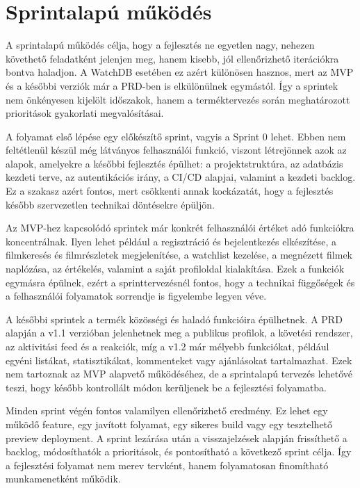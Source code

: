 \section{Sprintalapú működés}

A sprintalapú működés célja, hogy a fejlesztés ne egyetlen nagy, nehezen követhető feladatként jelenjen meg, hanem kisebb, jól ellenőrizhető iterációkra bontva haladjon. A WatchDB esetében ez azért különösen hasznos, mert az MVP és a későbbi verziók már a PRD-ben is elkülönülnek egymástól. Így a sprintek nem önkényesen kijelölt időszakok, hanem a terméktervezés során meghatározott prioritások gyakorlati megvalósításai.

A folyamat első lépése egy előkészítő sprint, vagyis a Sprint 0 lehet. Ebben nem feltétlenül készül még látványos felhasználói funkció, viszont létrejönnek azok az alapok, amelyekre a későbbi fejlesztés épülhet: a projektstruktúra, az adatbázis kezdeti terve, az autentikációs irány, a CI/CD alapjai, valamint a kezdeti backlog. Ez a szakasz azért fontos, mert csökkenti annak kockázatát, hogy a fejlesztés később szervezetlen technikai döntésekre épüljön.

Az MVP-hez kapcsolódó sprintek már konkrét felhasználói értéket adó funkciókra koncentrálnak. Ilyen lehet például a regisztráció és bejelentkezés elkészítése, a filmkeresés és filmrészletek megjelenítése, a watchlist kezelése, a megnézett filmek naplózása, az értékelés, valamint a saját profiloldal kialakítása. Ezek a funkciók egymásra épülnek, ezért a sprinttervezésnél fontos, hogy a technikai függőségek és a felhasználói folyamatok sorrendje is figyelembe legyen véve.

A későbbi sprintek a termék közösségi és haladó funkcióira épülhetnek. A PRD alapján a v1.1 verzióban jelenhetnek meg a publikus profilok, a követési rendszer, az aktivitási feed és a reakciók, míg a v1.2 már mélyebb funkciókat, például egyéni listákat, statisztikákat, kommenteket vagy ajánlásokat tartalmazhat. Ezek nem tartoznak az MVP alapvető működéséhez, de a sprintalapú tervezés lehetővé teszi, hogy később kontrollált módon kerüljenek be a fejlesztési folyamatba.

Minden sprint végén fontos valamilyen ellenőrizhető eredmény. Ez lehet egy működő feature, egy javított folyamat, egy sikeres build vagy egy tesztelhető preview deployment. A sprint lezárása után a visszajelzések alapján frissíthető a backlog, módosíthatók a prioritások, és pontosítható a következő sprint célja. Így a fejlesztési folyamat nem merev tervként, hanem folyamatosan finomítható munkamenetként működik.
